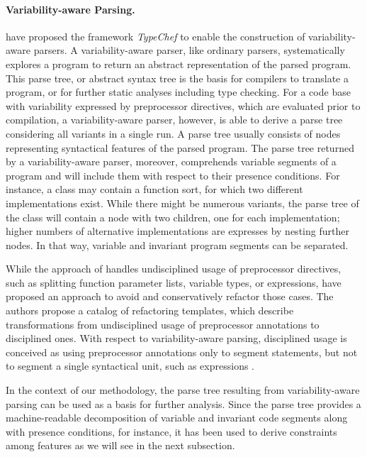 \paragraph{Variability-aware Parsing.} \cite{kastner_variability-aware_2011}
have proposed the framework \emph{TypeChef} to enable the construction of
variability-aware parsers. A variability-aware parser, like ordinary parsers,
systematically explores a program to return an abstract representation of the
parsed program. This parse tree, or abstract syntax tree
is the basis for compilers to translate a program, or for further static
analyses including type checking. For a code base with variability expressed by
preprocessor directives, which are evaluated prior to compilation, a
variability-aware parser, however, is able to derive a parse tree considering
all variants in a single run. A parse tree usually consists of nodes
representing syntactical features of the parsed program. The parse tree
returned by a variability-aware parser, moreover, comprehends variable segments
of a program and will include them with respect to their presence conditions.
For instance, a class may contain a function sort, for which two different
implementations exist. While there might be numerous variants, the parse tree
of the class will contain a node with two children, one for each
implementation; higher numbers of alternative implementations are expresses by
nesting further nodes. In that way, variable and invariant program segments
can be separated.

While the approach of \cite{kastner_variability-aware_2011} handles
undisciplined usage of preprocessor directives, such as splitting function parameter lists, variable types, or
expressions, \cite{medeiros_discipline_2017} have proposed an approach to avoid and
conservatively refactor those cases. The authors propose a catalog of
refactoring templates, which describe transformations from undisciplined usage
of preprocessor annotations to disciplined ones. With respect to
variability-aware parsing, disciplined usage is conceived as using preprocessor
annotations only to segment statements, but not to segment a single syntactical
unit, such as expressions \citep{medeiros_discipline_2017}.

{
\color{gray}
In the context of our methodology, the parse tree resulting from
variability-aware parsing can be used as a basis for further analysis. Since
the parse tree provides a machine-readable decomposition of variable and
invariant code segments along with presence conditions, for instance, it has
been used to derive constraints among features
\citep{nadi_mining_2014,nadi_where_2015} as we will see in the next subsection.
}

